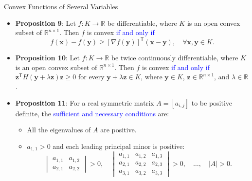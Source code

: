 \documentclass[aspectratio=169,hyperref,UTF8,CJK]{beamer}
\newcommand{\R}{\mathbb{R}}
\newcommand{\trans}{\mathsf{T}}
\newcommand{\vect}[1]{\boldsymbol{#1}}
\begin{document}
\begin{frame}{Convex Functions of Several Variables}
  \scriptsize
  \begin{itemize}
    \item \textbf{Proposition 9}: Let $f:K\to\R$ be differentiable, where $K$ is an open convex subset of $\R^{n\times1}$. Then $f$ is convex \textcolor{blue}{if and only if}
      \begin{equation*}
        f(\vect{x})-f(\vect{y})\ge[\nabla f(\vect{y})]^{\trans}(\vect{x}-\vect{y}),
        \quad\forall\vect{x},\vect{y}\in K.
      \end{equation*}
    \item \textbf{Proposition 10}: Let $f:K\to\R$ be twice continuously differentiable, where $K$ is an open convex subset of $\R^{n\times1}$. Then $f$ is convex \textcolor{blue}{if and only if} $\vect{z}^{\trans}H(\vect{y}+\lambda\vect{z})\vect{z}\ge0$ for every $\vect{y}+\lambda\vect{z}\in K$, where $\vect{y}\in K$, $\vect{z}\in\R^{n\times1}$, and $\lambda\in\R$.
    \item \textbf{Proposition 11}: For a real symmetric matrix $A=[a_{i,j}]$ to be positive definite, the \textcolor{blue}{sufficient and necessary conditions} are:
      \begin{itemize}
        \item All the eigenvalues of $A$ are positive.
        \item $a_{1,1}>0$ and each leading principal minor is positive:
          \begin{equation*}
            \begin{vmatrix}a_{1,1}&a_{1,2}\\a_{2,1}&a_{2,2}\end{vmatrix}>0,\quad
            \begin{vmatrix}a_{1,1}&a_{1,2}&a_{1,3}\\a_{2,1}&a_{2,2}&a_{2,3}\\a_{3,1}&a_{3,2}&a_{3,3}\end{vmatrix}>0,\quad\ldots,\quad |A|>0.
          \end{equation*}
      \end{itemize}
  \end{itemize}
\end{frame}
\end{document}
